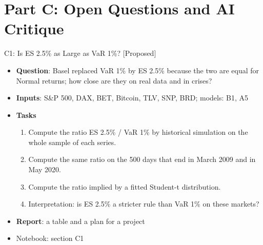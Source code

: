 \section{Part C: Open Questions and AI Critique}

\begin{frame}{C1: Is ES 2.5\% as Large as VaR 1\%? [Proposed]}
\itemsize{\footnotesize}
\begin{itemize}
\item \textbf{Question}: Basel replaced VaR 1\% by ES 2.5\% because the two are equal for Normal returns; how close are they on real data and in crises?
\item \textbf{Inputs}: S\&P 500, DAX, BET, Bitcoin, TLV, SNP, BRD; models: B1, A5
\item \textbf{Tasks}
\begin{enumerate}
    \item Compute the ratio ES 2.5\% / VaR 1\% by historical simulation on the whole sample of each series.
    \item Compute the same ratio on the 500 days that end in March 2009 and in May 2020.
    \item Compute the ratio implied by a fitted Student-t distribution.
    \item Interpretation: is ES 2.5\% a stricter rule than VaR 1\% on these markets?
\end{enumerate}
\item \textbf{Report}: a table and a plan for a project
\item Notebook: section C1
\end{itemize}
\end{frame}

